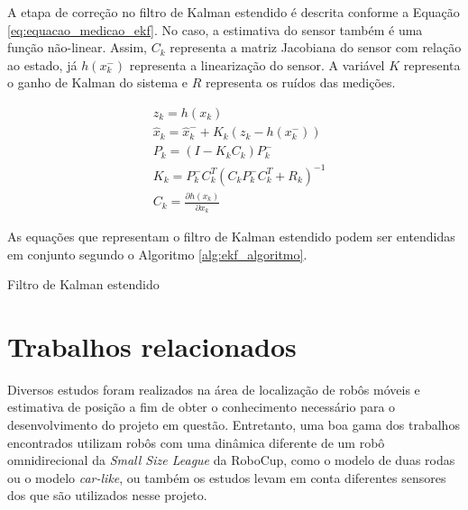 \documentclass[acronym, symbols, table, deposito]{fei}
\begin{document}
			A etapa de correção no filtro de Kalman estendido é descrita conforme a Equação \eqref{eq:equacao_medicao_ekf}. No caso, a estimativa do sensor também é uma função não-linear. Assim, $C_k$ representa a matriz Jacobiana do sensor com relação ao estado, já $h(x_{k}^{-})$ representa a linearização do sensor. A variável $K$ representa o ganho de Kalman do sistema e $R$ representa os ruídos das medições.
			
			\begin{equation} \label{eq:equacao_medicao_ekf}
				\begin{split}
					&z_k = h(x_{k}) \\
					&\hat{x}_{k} = \hat{x}_{k}^{-} + K_{k}(z_k - h(x_{k}^{-})) \\
					&P_{k} = (I - K_{k}C_{k})P_{k}^{-} \\
					&K_k = P_{k}^{-}C_{k}^T(C_{k}P_{k}^{-}C_{k}^T + R_k)^{-1} \\
					&C_k = \frac{\partial h(x_k)}{\partial x_{k}}
				\end{split}
			\end{equation}
			
			As equações que representam o filtro de Kalman estendido podem ser entendidas em conjunto segundo o Algoritmo \ref{alg:ekf_algoritmo}.
			
			\begin{algorithm}
					\caption{Filtro de Kalman estendido}\label{alg:ekf_algoritmo}
			\end{algorithm}
			
\chapter{Trabalhos relacionados}\label{sec:trab_relacionados}
Diversos estudos foram realizados na área de localização de robôs móveis e estimativa de posição a fim de obter o conhecimento necessário para o desenvolvimento do projeto em questão. Entretanto, uma boa gama dos trabalhos encontrados utilizam robôs com uma dinâmica diferente de um robô omnidirecional da \textit{Small Size League} da RoboCup, como o modelo de duas rodas ou o modelo \textit{car-like}, ou também os estudos levam em conta diferentes sensores dos que são utilizados nesse projeto.
\end{document}
